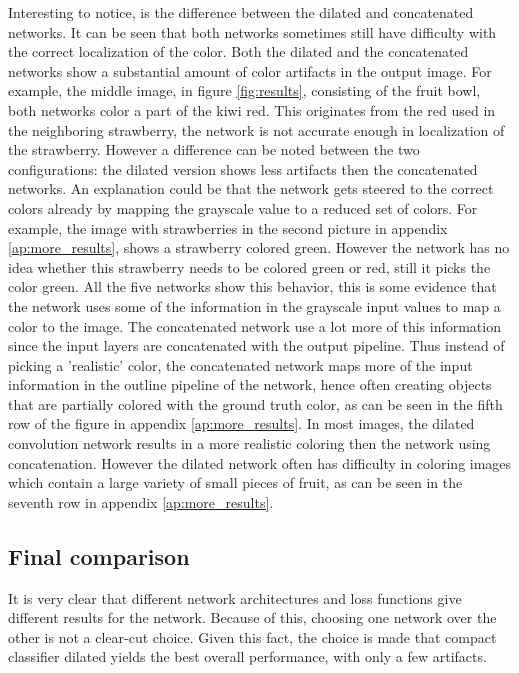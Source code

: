 Interesting to notice, is the difference between the dilated and concatenated networks. It can be seen that both networks sometimes still have difficulty with the correct localization of the color. Both the dilated and the concatenated networks show a substantial amount of color artifacts in the output image. For example, the middle image, in figure \ref{fig:results}, consisting of the fruit bowl, both networks color a part of the kiwi red. This originates from the red used in the neighboring strawberry, the network is not accurate enough in localization of the strawberry. However a difference can be noted between the two configurations: the dilated version shows less artifacts then the concatenated networks. An explanation could be that the network gets steered to the correct colors already by mapping the grayscale value to a reduced set of colors. For example, the image with strawberries in the second picture in appendix \ref{ap:more_results}, shows a strawberry colored green. However the network has no idea whether this strawberry needs to be colored green or red, still it picks the color green. All the five networks show this behavior, this is some evidence that the network uses some of the information in the grayscale input values to map a color to the image. The concatenated network use a lot more of this information since the input layers are concatenated with the output pipeline. Thus instead of picking a 'realistic' color, the concatenated network maps more of the input information in the outline pipeline of the network, hence often creating objects that are partially colored with the ground truth color, as can be seen in the fifth row of the figure in appendix \ref{ap:more_results}. In most images, the dilated convolution network results in a more realistic coloring then the network using concatenation. However the dilated network often has difficulty in coloring images which contain a large variety of small pieces of fruit, as can be seen in the seventh row in appendix \ref{ap:more_results}.

\subsection{Final comparison}
It is very clear that different network architectures and loss functions give different results for the network. Because of this, choosing one network over the other is not a clear-cut choice. Given this fact, the choice is made that compact classifier dilated yields the best overall performance, with only a few artifacts.








